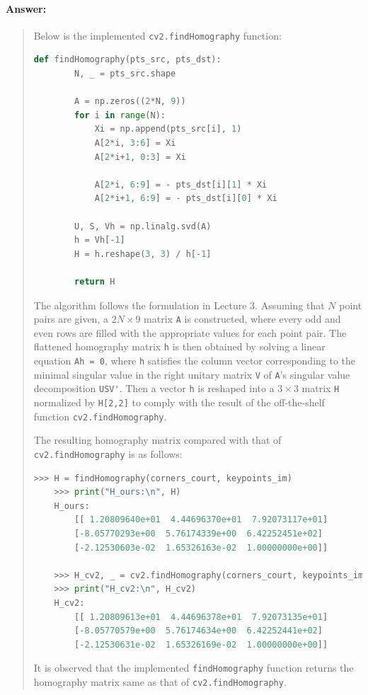 \documentclass[11pt]{article}
\begin{document}
\paragraph{Answer:} 
\begin{quote}
    Below is the implemented \verb|cv2.findHomography| function:
    \begin{lstlisting}[language=Python]
    def findHomography(pts_src, pts_dst):
        N, _ = pts_src.shape
        
        A = np.zeros((2*N, 9))
        for i in range(N):
            Xi = np.append(pts_src[i], 1)
            A[2*i, 3:6] = Xi
            A[2*i+1, 0:3] = Xi
            
            A[2*i, 6:9] = - pts_dst[i][1] * Xi
            A[2*i+1, 6:9] = - pts_dst[i][0] * Xi
        
        U, S, Vh = np.linalg.svd(A)
        h = Vh[-1]
        H = h.reshape(3, 3) / h[-1]

        return H
    \end{lstlisting}

    The algorithm follows the formulation in Lecture 3. Assuming that $N$ point pairs are given, a $2N \times 9$ matrix \verb|A| is constructed, where every odd and even rows are filled with the appropriate values for each point pair. The flattened homography matrix \verb|h| is then obtained by solving a linear equation \verb|Ah = 0|, where \verb|h| satisfies the column vector corresponding to the minimal singular value in the right unitary matrix \verb|V| of \verb|A|'s singular value decomposition \verb|USV'|. Then a vector \verb|h| is reshaped into a $3 \times 3$ matrix \verb|H| normalized by \verb|H[2,2]| to comply with the result of the off-the-shelf function \verb|cv2.findHomography|.

    The resulting homography matrix compared with that of \verb|cv2.findHomography| is as follows:
    \begin{lstlisting}[language=Python]
    >>> H = findHomography(corners_court, keypoints_im)
    >>> print("H_ours:\n", H)
    H_ours: 
        [[ 1.20809640e+01  4.44696370e+01  7.92073117e+01]
        [-8.05770293e+00  5.76174339e+00  6.42252451e+02]
        [-2.12530603e-02  1.65326163e-02  1.00000000e+00]]
    
    >>> H_cv2, _ = cv2.findHomography(corners_court, keypoints_im)
    >>> print("H_cv2:\n", H_cv2)
    H_cv2:
        [[ 1.20809613e+01  4.44696378e+01  7.92073135e+01]
        [-8.05770579e+00  5.76174634e+00  6.42252441e+02]
        [-2.12530631e-02  1.65326169e-02  1.00000000e+00]]
    \end{lstlisting}
    It is observed that the implemented \verb|findHomography| function returns the homography matrix same as that of \verb|cv2.findHomography|.
\end{quote}
\end{document}
